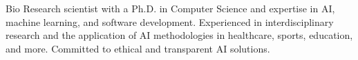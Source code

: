 \begin{rubric}{Bio}
\entry*[]
Research scientist with a Ph.D. in Computer Science and expertise in AI, machine learning, and software development. Experienced in interdisciplinary research and the application of AI methodologies in healthcare, sports, education, and more. Committed to ethical and transparent AI solutions.
\end{rubric}